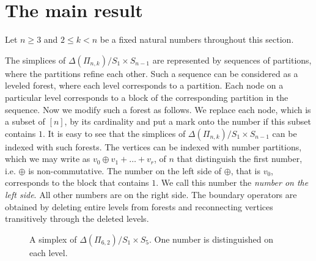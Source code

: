 \documentclass{elsarticle}
\begin{document}
\section{The main result}
Let $n\geq 3$ and $2\leq k<n$ be a fixed natural numbers throughout this section.

The simplices of $\Delta(\Pi_{n,k})/S_1\times S_{n-1}$ are represented by sequences of partitions, where the partitions refine each other. Such a sequence can be considered as a leveled forest, where each level corresponds to a partition. Each node on a particular level corresponds to a block of the corresponding partition in the sequence. Now we modify such a forest as follows. We replace each node, which is a subset of $[n]$, by its cardinality and put a mark onto the number if this subset contains $1$. It is easy to see that the simplices of $\Delta(\Pi_{n,k})/S_1\times S_{n-1}$ can be indexed with such forests. The vertices can be indexed with number partitions, which we may write as $v_0\oplus v_1+\dots+v_r$, of $n$ that distinguish the first number, i.e. $\oplus$ is non-commutative. The number on the left side of $\oplus$, that is $v_0$, corresponds to the block that contains $1$. We call this number the \emph{number on the left side}. All other numbers are on the right side. The boundary operators are obtained by deleting entire levels from forests and reconnecting vertices transitively through the deleted levels.
\begin{figure}[ht]
\centering
 
\caption{A simplex of $\Delta(\Pi_{6,2})/S_1\times S_5$. One number is distinguished on each level.}
\end{figure}
\end{document}
